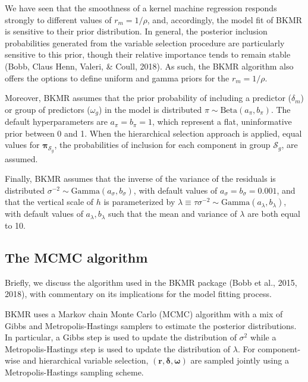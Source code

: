 \documentclass[12pt, twoside]{amherstthesis}
\begin{document}
We have seen that the smoothness of a kernel machine regression responds strongly to different values of \(r_m=1/\rho\), and, accordingly, the model fit of BKMR is sensitive to their prior distribution. In general, the posterior inclusion probabilities generated from the variable selection procedure are particularly sensitive to this prior, though their relative importance tends to remain stable (Bobb, Claus Henn, Valeri, \& Coull, 2018). As such, the BKMR algorithm also offers the options to define uniform and gamma priors for the \(r_m=1/\rho\).

Moreover, BKMR assumes that the prior probability of including a predictor (\(\delta_m\)) or group of predictors (\(\omega_g\)) in the model is distributed \(\pi \sim \text{Beta}(a_\pi, b_\pi)\). The default hyperparameters are \(a_\pi=b_\pi=1\), which represent a flat, uninformative prior between 0 and 1. When the hierarchical selection approach is applied, equal values for \(\boldsymbol\pi_{\mathcal{S}_g}\), the probabilities of inclusion for each component in group \(\mathcal{S}_g\), are assumed.

Finally, BKMR assumes that the inverse of the variance of the residuals is distributed \(\sigma^{-2} \sim \text{Gamma}(a_\sigma, b_\sigma)\), with default values of \(a_\sigma=b_\sigma=0.001\), and that the vertical scale of \(h\) is parameterized by \(\lambda \equiv \tau\sigma^{-2} \sim \text{Gamma}(a_\lambda, b_\lambda)\), with default values of \(a_\lambda, b_\lambda\) such that the mean and variance of \(\lambda\) are both equal to 10.

\hypertarget{the-mcmc-algorithm}{%
\subsection{The MCMC algorithm}\label{the-mcmc-algorithm}}

Briefly, we discuss the algorithm used in the BKMR package (Bobb et al., 2015, 2018), with commentary on its implications for the model fitting process.

BKMR uses a Markov chain Monte Carlo (MCMC) algorithm with a mix of Gibbs and Metropolis-Hastings samplers to estimate the posterior distributions. In particular, a Gibbs step is used to update the distribution of \(\sigma^2\) while a Metropolis-Hastings step is used to update the distribution of \(\lambda\). For component-wise and hierarchical variable selection, \((\textbf{r}, \boldsymbol\delta, \boldsymbol\omega)\) are sampled jointly using a Metropolis-Hastings sampling scheme.
\end{document}
